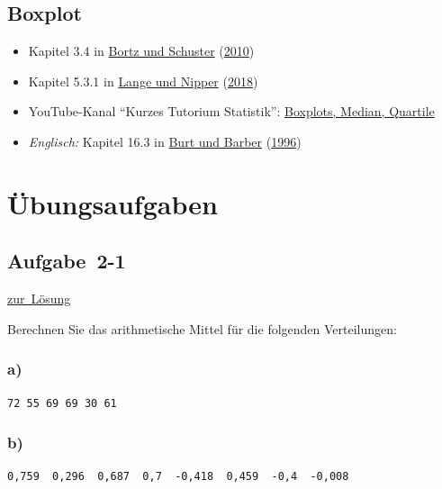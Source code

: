 \documentclass[
  11pt,
  ngerman,
  a4paper,
]{report}
\providecommand{\tightlist}{%
  \setlength{\itemsep}{0pt}\setlength{\parskip}{0pt}}
\begin{document}
\hypertarget{boxplot-1}{%
\subsection{Boxplot}\label{boxplot-1}}

\begin{itemize}
\tightlist
\item
  Kapitel 3.4 in \protect\hyperlink{ref-bortz}{Bortz und Schuster} (\protect\hyperlink{ref-bortz}{2010})
\item
  Kapitel 5.3.1 in \protect\hyperlink{ref-delange}{Lange und Nipper} (\protect\hyperlink{ref-delange}{2018})
\item
  YouTube-Kanal \enquote{Kurzes Tutorium Statistik}: \href{https://www.youtube.com/watch?v=HsDeAoBOyS4}{Boxplots, Median, Quartile}
\item
  \emph{Englisch:} Kapitel 16.3 in \protect\hyperlink{ref-burt}{Burt und Barber} (\protect\hyperlink{ref-burt}{1996})
\end{itemize}

\hypertarget{uxfcbungsaufgaben-1}{%
\section*{Übungsaufgaben}\label{uxfcbungsaufgaben-1}}

\hypertarget{aufgabe-2-1}{%
\subsection{Aufgabe~2-1}\label{aufgabe-2-1}}

\protect\hyperlink{loesung-2-1}{zur~Lösung}

Berechnen Sie das arithmetische Mittel für die folgenden Verteilungen:

\hypertarget{a}{%
\subsubsection{a)}\label{a}}

\begin{verbatim}
72 55 69 69 30 61
\end{verbatim}

\hypertarget{b}{%
\subsubsection{b)}\label{b}}

\begin{verbatim}
0,759  0,296  0,687  0,7  -0,418  0,459  -0,4  -0,008
\end{verbatim}
\end{document}
